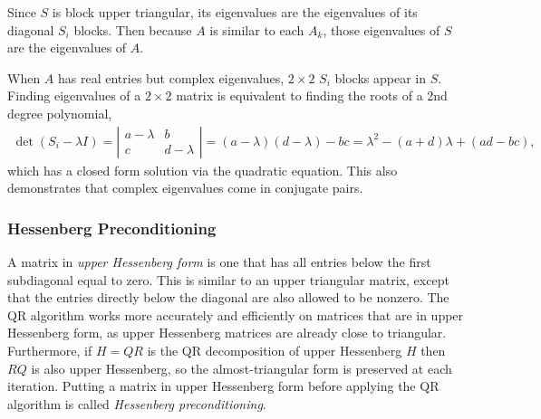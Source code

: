 Since $S$ is block upper triangular, its eigenvalues are the eigenvalues of its diagonal $S_i$ blocks.
Then because $A$ is similar to each $A_k$, those eigenvalues of $S$ are the eigenvalues of $A$.


When $A$ has real entries but complex eigenvalues, $2 \times 2$ $S_i$ blocks appear in $S$.
Finding eigenvalues of a $2 \times 2$ matrix is equivalent to finding the roots of a 2nd degree polynomial,
\begin{align}
\det(S_i - \lambda I) =
\left|\begin{array}{cc}
a - \lambda & b           \\
c           & d - \lambda
\end{array}\right|
= (a - \lambda)(d - \lambda) - bc
= \lambda^2 - (a+d)\lambda + (ad - bc),
\label{eq:qr-algorithm-roots}
\end{align}
which has a closed form solution via the quadratic equation.
This also demonstrates that complex eigenvalues come in conjugate pairs.

\subsubsection*{Hessenberg Preconditioning} %

A matrix in \emph{upper Hessenberg form} is one that has all entries below the first subdiagonal equal to zero.
This is similar to an upper triangular matrix, except that the entries directly below the diagonal are also allowed to be nonzero.
The QR algorithm works more accurately and efficiently on matrices that are in upper Hessenberg form, as upper Hessenberg matrices are already close to triangular.
Furthermore, if $H = QR$ is the QR decomposition of upper Hessenberg $H$ then $RQ$ is also upper Hessenberg, so the almost-triangular form is preserved at each iteration.
Putting a matrix in upper Hessenberg form before applying the QR algorithm is called \emph{Hessenberg preconditioning}.


